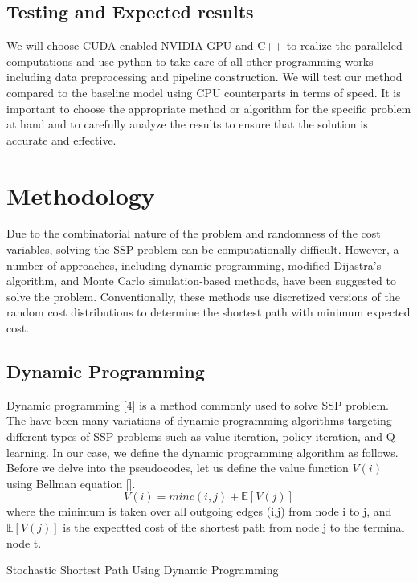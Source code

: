 \documentclass{article}
\begin{document}
\subsection{Testing and Expected results}

We will choose CUDA enabled NVIDIA GPU and C++ to realize the paralleled computations and use python 
to take care of all other programming works including data preprocessing and pipeline construction. 
We will test our method compared to the baseline model using CPU counterparts in terms of speed. 
It is important to choose the appropriate method or algorithm for the specific problem at hand and to 
carefully analyze the results to ensure that the solution is accurate and effective. 

\section{Methodology}
Due to the combinatorial nature of the problem and randomness of the cost variables, solving the SSP problem can
be computationally difficult. However, a number of approaches, including dynamic programming, modified 
Dijastra's algorithm, and Monte Carlo simulation-based methods, have been suggested to solve the problem.
Conventionally, these methods use discretized versions of the random cost distributions to determine the
shortest path with minimum expected cost. 

\subsection{Dynamic Programming}
Dynamic programming [4] is a method commonly used to solve SSP problem. The have been many variations of 
dynamic programming algorithms targeting different types of SSP problems such as value iteration, policy iteration,
and Q-learning. In our case, we define the dynamic programming algorithm as follows. Before 
we delve into the pseudocodes, let us define the value function $V(i)$ using Bellman equation [].
\begin{equation}
  V(i) = minc(i,j) + \mathbb{E}[V(j)]
\end{equation}
where the minimum is taken over all outgoing edges (i,j) from node i to j, and $\mathbb{E}[V(j)]$ is the expectted cost of the 
shortest path from node j to the terminal node t. 

\begin{algorithm}[H]

\caption{Stochastic Shortest Path Using Dynamic Programming}
\end{algorithm}
\end{document}
